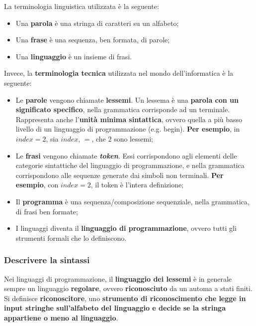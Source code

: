 \documentclass[a4paper]{article}
\begin{document}
	\noindent
	La terminologia linguistica utilizzata è la seguente:
	\begin{itemize}
		\item Una \textbf{parola} è una stringa di caratteri su un alfabeto;
		\item Una \textbf{frase} è una sequenza, ben formata, di parole;
		\item Una \textbf{linguaggio} è un insieme di frasi.
	\end{itemize}
	Invece, la \textbf{terminologia tecnica} utilizzata nel mondo dell'informatica è la seguente:
	\begin{itemize}
		\item Le \textbf{parole} vengono chiamate \textcolor{Red3}{\textbf{lessemi}}. Un lessema è una \textbf{parola con un significato specifico}, nella grammatica corrisponde ad un terminale. Rappresenta anche l'\textbf{unità minima sintattica}, ovvero quella a più basso livello di un linguaggio di programmazione (e.g. \textsf{begin}). \textbf{Per esempio}, in $index = 2$, sia $index$, $=$, che $2$ sono lessemi;
		\item Le \textbf{frasi} vengono chiamate \textcolor{Red3}{\textbf{\emph{token}}}. Essi corrispondono agli elementi delle categorie sintattiche del linguaggio di programmazione, e nella grammatica corrispondono alle sequenze generate dai simboli non terminali. \textbf{Per esempio}, con $index = 2$, il token è l'intera definizione;
		\item Il \textcolor{Red3}{\textbf{programma}} è una sequenza/composizione sequenziale, nella grammatica, di frasi ben formate;
		\item I linguaggi diventa il \textcolor{Red3}{\textbf{linguaggio di programmazione}}, ovvero tutti gli strumenti formali che lo definiscono.
	\end{itemize}\newpage

	\subsubsection{Descrivere la sintassi}

	Nei linguaggi di programmazione, il \textbf{linguaggio dei lessemi} è in generale sempre un linguaggio \textbf{regolare}, ovvero \textbf{riconosciuto} da un automa a stati finiti. Si definisce \textcolor{Red3}{\textbf{riconoscitore}}, uno \textbf{strumento di riconoscimento che legge in input stringhe sull'alfabeto del linguaggio e decide se la stringa appartiene o meno al linguaggio}.\newline
	
\end{document}
